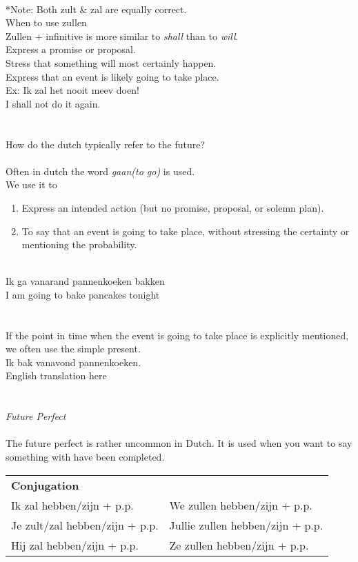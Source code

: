 \documentclass[letterpaper,11pt]{article}
\begin{document}
\\ 
*Note: Both zult \& zal are equally correct. \\ 
When to use zullen \\
Zullen + infinitive is more similar to \textit{shall} than to \textit{will}. \\
Express a promise or proposal. \\ 
Stress that something will most certainly happen. \\
Express that an event is likely going to take place. \\
Ex: Ik zal het nooit meev doen! \\
I shall not do it again. \\
\\ \\ 
How do the dutch typically refer to the future? \\ \\
Often in dutch the word \textit{gaan(to go)} is used. \\
We use it to \\
\begin{enumerate}
    \item Express an intended action (but no promise, proposal, or solemn plan).
    \item To say that an event is going to take place, without stressing the
        certainty or mentioning the probability.
\end{enumerate}
\\ 
Ik ga vanarand pannenkoeken bakken \\ 
I am going to bake pancakes tonight \\
\\ \\
If the point in time when the event is going to take place is explicitly
mentioned, we often use the simple present. \\
Ik bak vanavond pannenkoeken. \\
English translation here \\
\\ \\ 
\textit{Future Perfect} \\ \\
The future perfect is rather uncommon in Dutch. It is used when you want to say
something with have been completed. \\ 
\begin{tabular}[t]{l l}
    \textbf{Conjugation} \\
    Ik zal hebben/zijn + p.p. & We zullen hebben/zijn + p.p. \\
    Je zult/zal hebben/zijn + p.p. & Jullie zullen hebben/zijn + p.p. \\
    Hij zal hebben/zijn + p.p. & Ze zullen hebben/zijn + p.p. \\
\end{tabular} 
\end{document}
